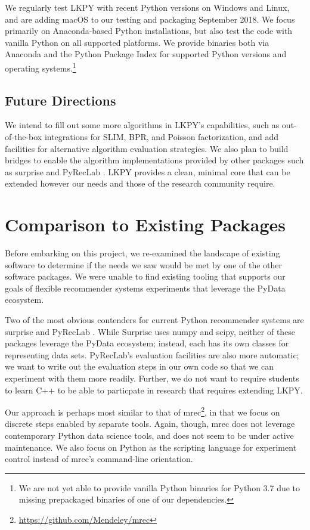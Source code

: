We regularly test LKPY with recent Python versions on Windows and Linux, and are adding  macOS to our testing and packaging September 2018.
We focus primarily on Anaconda-based Python installations, but also test the code with vanilla Python on all supported platforms.
We provide binaries both via Anaconda and the Python Package Index for supported Python versions and operating systems.\footnote{We are not yet able to provide vanilla Python binaries for Python 3.7 due to missing prepackaged binaries of one of our dependencies.}

\subsection{Future Directions}

We intend to fill out some more algorithms in LKPY's capabilities, such as out-of-the-box integrations for SLIM, BPR, and Poisson factorization, and add facilities for alternative algorithm evaluation strategies.
We also plan to build bridges to enable the algorithm implementations provided by other packages such as surprise \citep{Surprise} and PyRecLab \citep{Sepulveda2017-ma}.
LKPY provides a clean, minimal core that can be extended however our needs and those of the research community require.

\section{Comparison to Existing Packages}

Before embarking on this project, we re-examined the landscape of existing software to determine if the needs we saw would be met by one of the other software packages.
We were unable to find existing tooling that supports our goals of flexible recommender systems experiments that leverage the PyData ecosystem.

Two of the most obvious contenders for current Python recommender systems are surprise \citep{Surprise} and PyRecLab \citep{Sepulveda2017-ma}.
While Surprise uses numpy and scipy, neither of these packages leverage the PyData ecosystem; instead, each has its own classes for representing data sets.
PyRecLab's evaluation facilities are also more automatic; we want to write out the evaluation steps in our own code so that we can experiment with them more readily.
Further, we do not want to require students to learn C++ to be able to particpate in research that requires extending LKPY.

Our approach is perhaps most similar to that of mrec\footnote{\url{https://github.com/Mendeley/mrec}}, in that we focus on discrete steps enabled by separate tools.
Again, though, mrec does not leverage contemporary Python data science tools, and does not seem to be under active maintenance.
We also focus on Python as the scripting language for experiment control instead of mrec's command-line orientation.

